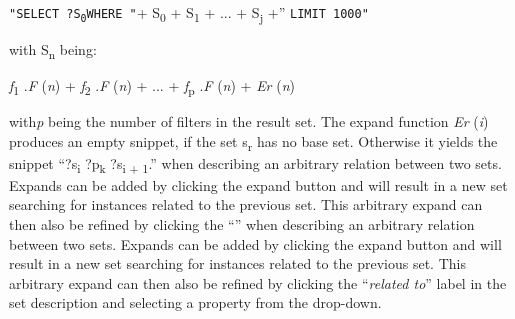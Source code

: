 \documentclass{sig-alternate}
\begin{document}
\Verb+"SELECT ?S+\textsubscript{\Verb+0+}\Verb+WHERE "++ S\textsubscript{0 }+ S\textsubscript{1 }+ ... + S\textsubscript{j }+\Verb++'' \Verb+LIMIT 1000"+

with S\textsubscript{n} being:

{\em f}\textsubscript{1} .{\em F} ({\em n}) + {\em f}\textsubscript{2} .{\em F} ({\em n}) + ... + {\em f}\textsubscript{p} .{\em F} ({\em n}) + {\em Er} ({\em n})

with{\em  p} being the number of ﬁlters in the result set. The expand function {\em Er} ({\em i}) produces an empty snippet, if the set s\textsubscript{r} has no base set. Otherwise it yields the snippet ``?s\textsubscript{i} ?p\textsubscript{k} ?s\textsubscript{i + 1}.'' when describing an arbitrary relation between two sets. Expands can be added by clicking the expand button and will result in a new set searching for instances related to the previous set. This arbitrary expand can then also be reﬁned by clicking the ``'' when describing an arbitrary relation between two sets. Expands can be added by clicking the expand button and will result in a new set searching for instances related to the previous set. This arbitrary expand can then also be reﬁned by clicking the ``{\em related to}'' label in the set description and selecting a property from the drop-down.
\end{document}
